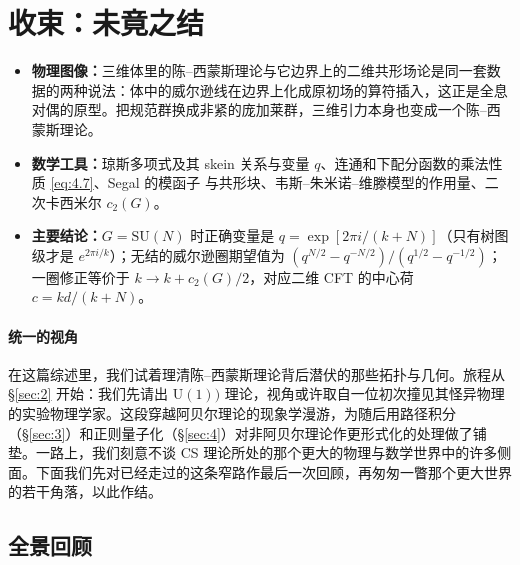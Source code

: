 
\section{收束：未竟之结}\label{sec:5}

\begin{keytakeaways}
\begin{itemize}[leftmargin=1.4em,itemsep=2pt,topsep=2pt]
  \item \textbf{物理图像：}三维体里的陈--西蒙斯理论与它边界上的二维共形场论是同一套数据的两种说法：体中的威尔逊线在边界上化成原初场的算符插入，这正是全息对偶的原型。把规范群换成非紧的庞加莱群，三维引力本身也变成一个陈--西蒙斯理论。
  \item \textbf{数学工具：}琼斯多项式及其 skein 关系与变量 $q$、连通和下配分函数的乘法性质 \eqref{eq:4.7}、Segal 的模函子 \cite{segal} 与共形块、韦斯--朱米诺--维滕模型的作用量、二次卡西米尔 $c_2(G)$。
  \item \textbf{主要结论：}$G=\mathrm{SU}(N)$ 时正确变量是 $q=\exp[2\pi i/(k+N)]$（只有树图级才是 $e^{2\pi i/k}$）；无结的威尔逊圈期望值为 $(q^{N/2}-q^{-N/2})/(q^{1/2}-q^{-1/2})$；一圈修正等价于 $k\to k+c_2(G)/2$，对应二维 CFT 的中心荷 $c=kd/(k+N)$。
\end{itemize}
\end{keytakeaways}

\paragraph{统一的视角}
在这篇综述里，我们试着理清陈--西蒙斯理论背后潜伏的那些拓扑与几何。旅程从 \S\ref{sec:2} 开始：我们先请出 $\mathrm{U}(1))$ 理论，视角或许取自一位初次撞见其怪异物理的实验物理学家。这段穿越阿贝尔理论的现象学漫游，为随后用路径积分（\S\ref{sec:3}）和正则量子化（\S\ref{sec:4}）对非阿贝尔理论作更形式化的处理做了铺垫。一路上，我们刻意不谈 CS 理论所处的那个更大的物理与数学世界中的许多侧面。下面我们先对已经走过的这条窄路作最后一次回顾，再匆匆一瞥那个更大世界的若干角落，以此作结。

\subsection{全景回顾}\label{sec:5.1}

